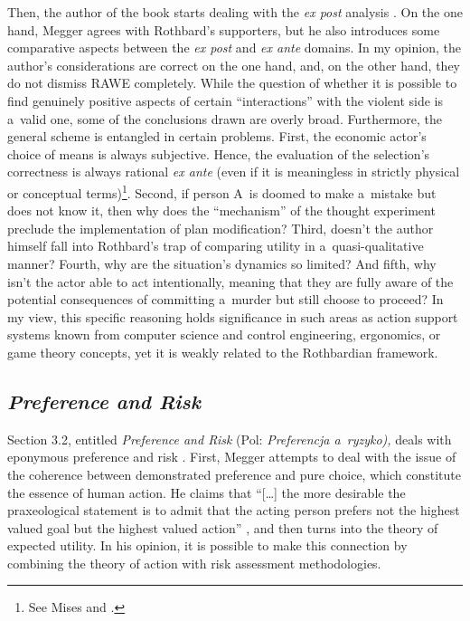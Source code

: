 Then, the author of the book starts dealing with the \textit{ex post} analysis 
\parencite[][pp.70–72]{megger_sprawiedliwosc_2021}. %
 On the one hand, Megger agrees with Rothbard's supporters, but he also introduces some comparative aspects between the \textit{ex post} and \textit{ex ante} domains. In my opinion, the author's considerations are correct on the one hand, and, on the other hand, they do not dismiss RAWE completely. While the question of whether it is possible to find genuinely positive aspects of certain ``interactions'' with the violent side is a~valid one, some of the conclusions drawn are overly broad. Furthermore, the general scheme is entangled in certain problems. First, the economic actor's choice of means is always subjective. Hence, the evaluation of the selection's correctness is always rational \textit{ex ante} (even if it is meaningless in strictly physical or conceptual terms)\footnote{See Mises 
\parencite[pp.13–23,][]{} %
 and 
\parencite[pp.264–271,][]{}.%
}. Second, if person A~is doomed to make a~mistake but does not know it, then why does the ``mechanism'' of the thought experiment preclude the implementation of plan modification? Third, doesn't the author himself fall into Rothbard's trap of comparing utility in a~quasi-qualitative manner? Fourth, why are the situation's dynamics so limited? And fifth, why isn't the actor able to act intentionally, meaning that they are fully aware of the potential consequences of committing a~murder but still choose to proceed? In my view, this specific reasoning holds significance in such areas as action support systems known from computer science and control engineering, ergonomics, or game theory concepts, yet it is weakly related to the Rothbardian framework.



\subsection{\itshape Preference and Risk }



Section 3.2, entitled \textit{Preference and Risk} (Pol: \textit{Preferencja a~ryzyko),} deals with eponymous preference and risk 
\parencite[][pp.73–82]{megger_sprawiedliwosc_2021}. %
 First, Megger attempts to deal with the issue of the coherence between demonstrated preference and pure choice, which constitute the essence of human action. He claims that ``[…] the more desirable the praxeological statement is to admit that the acting person prefers not the highest valued goal but the highest valued action'' 
\parencite[][p.74]{megger_sprawiedliwosc_2021}, %
 and then turns into the theory of expected utility. In his opinion, it is possible to make this connection by combining the theory of action with risk assessment methodologies.



